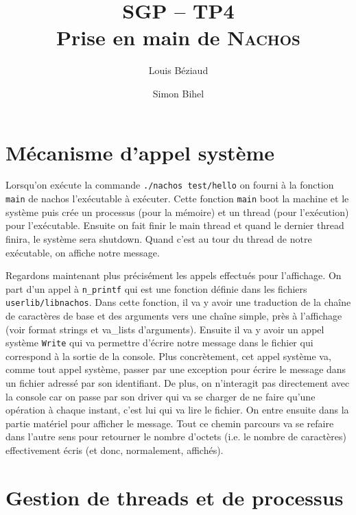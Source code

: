 \documentclass[a4paper,11pt,french]{article}
\title{SGP -- TP4\\Prise en main de \textsc{Nachos}}
\author{Louis Béziaud \and Simon Bihel}
\begin{document}
\maketitle

\section{Mécanisme d'appel système}
Lorsqu'on exécute la commande \texttt{./nachos test/hello} on fourni à
la fonction \texttt{main} de nachos l'exécutable à exécuter. Cette
fonction \texttt{main} boot la machine et le système puis crée un
processus (pour la mémoire) et un thread (pour l'exécution) pour
l'exécutable. Ensuite on fait finir le main thread et quand le dernier
thread finira, le système sera shutdown. Quand c'est au tour du thread
de notre exécutable, on affiche notre message.


Regardons maintenant plus précisément les appels effectués pour
l'affichage. On part d'un appel à \texttt{n\_printf} qui est une
fonction définie dans les fichiers \texttt{userlib/libnachos}. Dans
cette fonction, il va y avoir une traduction de la chaîne de
caractères de base et des arguments vers une chaîne simple, près à
l'affichage (voir format strings et va\_lists d'arguments). Ensuite il
va y avoir un appel système \texttt{Write} qui va permettre d'écrire
notre message dans le fichier qui correspond à la sortie de la
console. Plus concrètement, cet appel système va, comme tout appel
système, passer par une exception pour écrire le message dans un
fichier adressé par son identifiant. De plus, on n'interagit pas
directement avec la console car on passe par son driver qui va se
charger de ne faire qu'une opération à chaque instant, c'est lui qui
va lire le fichier. On entre ensuite dans la partie matériel pour
afficher le message. Tout ce chemin parcours va se refaire dans
l'autre sens pour retourner le nombre d'octets (i.e. le nombre de
caractères) effectivement écris (et donc, normalement, affichés).

\section{Gestion de threads et de processus}
\end{document}
